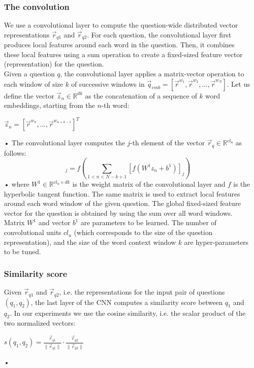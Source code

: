 \documentclass[10pt,twocolumn,letterpaper]{article}
\begin{document}
\subsubsection{The convolution}
We use a convolutional layer to compute the question-wide distributed vector representations $\vec{r}_{q1}$ and $\vec{r}_{q2}$. For each question, the convolutional layer first produces local features around each word in the question. Then, it combines these local features using a sum operation to create a fixed-sized feature vector (representation) for the question.\\
Given a question $q$, the convolutional layer applies a matrix-vector operation to each window of size $k$ of successive windows in $\vec{q}_{emb} = [\vec{r}^{w_1},\vec{r}^{w_2}, ..., \vec{r}^{w_N}]$. Let us define the vector $\vec{z}_n \in \mathbb{R}^{dk}$ as the concatenation of a sequence of $k$ word embeddings, starting from the $n$-th word:
\begin{center}
$\vec{z}_n = [\vec{r}^{w_n}, ... ,\vec{r}^{w_{n+k-1}}]^T$
\end{center}•
The convolutional layer computes the $j$-th element of the vector $\vec{r}_{q} \in \mathbb{R}^{cl_u}$ as follows: 
\begin{equation}
[\vec{r}_{q}]_j = f \left( \sum_{1<n<N-k+1}[f(W^1 z_n + b^1)]_j \right)
\label{eq:conv}
\end{equation}•
where $W^1 \in \mathbb{R}^{cl_u \times dk}$ is the weight matrix of the convolutional layer and $f$ is the hyperbolic tangent function. The same matrix is used to extract local features around each word window of the given question. The global fixed-sized feature vector for the question is obtained by using the sum over all word windows.\\
Matrix $W^1$ and vector $b^1$ are parameters to be learned. The number of convolutional units $cl_u$ (which corresponds to the size of the question representation), and the size of the word context window $k$ are hyper-parameters to be tuned. 

\subsubsection{Similarity score}
Given $\vec{r}_{q1}$ and $\vec{r}_{q2}$, i.e. the representations for the input pair of questions $(q_1, q_2)$, the last layer of the CNN computes a similarity score between $q_1$ and $q_2$. In our experiments we use the cosine similarity, i.e. the scalar product of the two normalized vectors:
\begin{center}
$s(q_1, q_2) = \frac{\vec{r}_{q1}}{\lVert \vec{r}_{q1} \rVert} \cdot \frac{\vec{r}_{q2}}{\lVert \vec{r}_{q2} \rVert}$
\end{center}•
\end{document}

